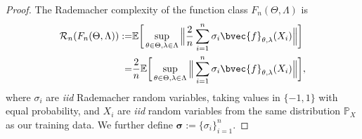 \documentclass[runningheads, envcountsame, a4paper]{llncs}
\begin{document}
			\begin{proof}
				The Rademacher complexity \citep[Definition 2]{bartlett2002rademacher} of the function class $F_{n}(\Theta, \Lambda)$ is 
				\begin{equation}
				\begin{aligned}
					\mathcal{R}_{n}(F_{n}(\Theta, \Lambda)) :=& \mathbb{E}\bigg[\sup_{\theta \in \Theta, \lambda \in \Lambda} \Big\| \frac{2}{n} \sum_{i = 1}^{n} \sigma_{i}\bvec{f}_{\theta, \lambda}(X_{i}) \Big\|\bigg] \\
					=& \frac{2}{n} \mathbb{E}\bigg[\sup_{\theta \in \Theta, \lambda \in \Lambda} \Big\| \sum_{i = 1}^{n} \sigma_{i}\bvec{f}_{\theta, \lambda}(X_{i}) \Big\|\bigg],
				\end{aligned}
				\end{equation}
				where $\sigma_{i}$ are \textit{iid} Rademacher random variables, taking values in $\{-1, 1\}$ with equal probability, and $X_{i}$ are \textit{iid} random variables from the same distribution $\mathbb{P}_{X}$ as our training data. We further define $\bm{\sigma} := \{\sigma_{i}\}_{i = 1}^{n}$.
				

\end{proof}
\end{document}
